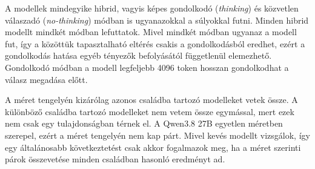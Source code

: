\documentclass[
]{elteikthesis}[2024/04/26]
\begin{document}
A modellek mindegyike hibrid, vagyis képes gondolkodó (\textit{thinking}) és
közvetlen válaszadó (\textit{no-thinking}) módban is ugyanazokkal a súlyokkal
futni. Minden hibrid modellt %
mindkét módban lefuttatok. Mivel mindkét módban ugyanaz a modell fut, így a
közöttük tapasztalható eltérés csakis a gondolkodásból eredhet, ezért a
gondolkodás hatása egyéb tényezők befolyásától függetlenül elemezhető.
Gondolkodó módban a modell legfeljebb 4096 token hosszan gondolkodhat a válasz
megadása előtt. %

A méret %
tengelyén kizárólag azonos családba tartozó modelleket vetek össze. A különböző
családba tartozó modelleket nem vetem össze egymással, mert ezek nem csak egy
tulajdonságban térnek el. A Qwen3.8 27B egyetlen méretben szerepel, ezért a
méret tengelyén nem kap párt. %
Mivel kevés modellt vizsgálok, így egy általánosabb következtetést csak akkor
fogalmazok meg, ha a méret szerinti párok összevetése minden családban hasonló
eredményt ad. %
\end{document}
